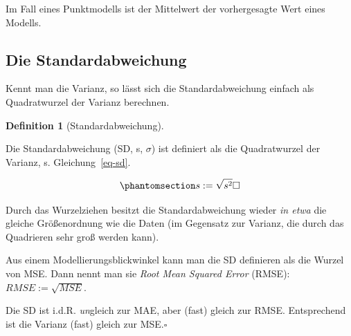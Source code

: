 \documentclass[
  letterpaper,
]{scrbook}
\theoremstyle{definition}
\theoremstyle{definition}
\newtheorem{definition}{Definition}[chapter]
\theoremstyle{definition}
\theoremstyle{remark}
\begin{document}
Im Fall eines Punktmodells ist der Mittelwert der vorhergesagte Wert
eines Modells.

\subsection{Die Standardabweichung}\label{die-standardabweichung}

Kennt man die Varianz, so lässt sich die Standardabweichung einfach als
Quadratwurzel der Varianz berechnen.

\begin{definition}[Standardabweichung]\protect\hypertarget{def-sd}{}\label{def-sd}

Die Standardabweichung (SD, s, \(\sigma\)) ist definiert als die
Quadratwurzel der Varianz, s. Gleichung~\ref{eq-sd}.

\begin{equation}\phantomsection\label{eq-sd}{s := \sqrt{s^2} \square}\end{equation}

\end{definition}

Durch das Wurzelziehen besitzt die Standardabweichung wieder \emph{in
etwa} die gleiche Größenordnung wie die Daten (im Gegensatz zur Varianz,
die durch das Quadrieren sehr groß werden kann).

Aus einem Modellierungsblickwinkel kann man die SD definieren als die
Wurzel von MSE. Dann nennt man sie \emph{Root Mean Squared Error}
(RMSE): \(RMSE := \sqrt{MSE}\).

\begin{tcolorbox}[enhanced jigsaw, left=2mm, toptitle=1mm, toprule=.15mm, rightrule=.15mm, leftrule=.75mm, breakable, colbacktitle=quarto-callout-note-color!10!white, colback=white, coltitle=black, bottomtitle=1mm, opacityback=0, title=\textcolor{quarto-callout-note-color}{\faInfo}\hspace{0.5em}{Hinweis}, colframe=quarto-callout-note-color-frame, arc=.35mm, opacitybacktitle=0.6, bottomrule=.15mm, titlerule=0mm]

Die SD ist i.d.R. \emph{un}gleich zur MAE, aber (fast) gleich zur RMSE.
Entsprechend ist die Varianz (fast) gleich zur MSE.\(\square\)

\end{tcolorbox}
\end{document}
